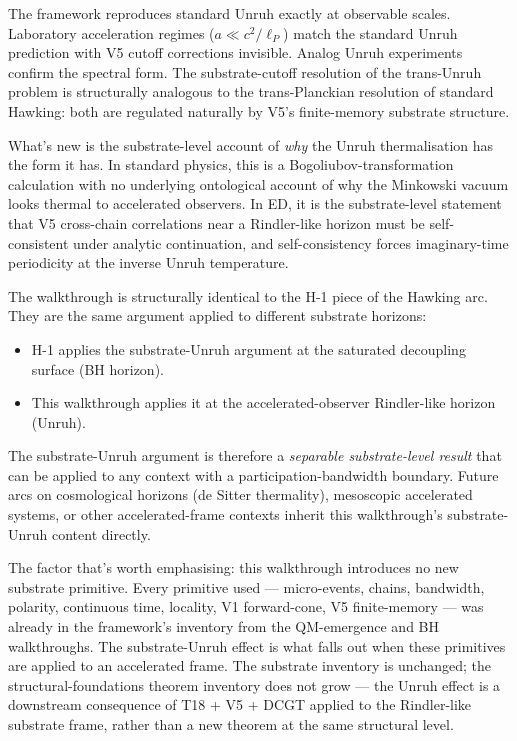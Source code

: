 \documentclass[11pt,a4paper]{article}
\begin{document}
The framework reproduces standard Unruh exactly at observable scales. Laboratory acceleration regimes ($a \ll c^{2}/\ell_P$) match the standard Unruh prediction with V5 cutoff corrections invisible. Analog Unruh experiments confirm the spectral form. The substrate-cutoff resolution of the trans-Unruh problem is structurally analogous to the trans-Planckian resolution of standard Hawking: both are regulated naturally by V5's finite-memory substrate structure.

What's new is the substrate-level account of \emph{why} the Unruh thermalisation has the form it has. In standard physics, this is a Bogoliubov-transformation calculation with no underlying ontological account of why the Minkowski vacuum looks thermal to accelerated observers. In ED, it is the substrate-level statement that V5 cross-chain correlations near a Rindler-like horizon must be self-consistent under analytic continuation, and self-consistency forces imaginary-time periodicity at the inverse Unruh temperature.

The walkthrough is structurally identical to the H-1 piece of the Hawking arc. They are the same argument applied to different substrate horizons:
\begin{itemize}[noitemsep]
\item H-1 applies the substrate-Unruh argument at the saturated decoupling surface (BH horizon).
\item This walkthrough applies it at the accelerated-observer Rindler-like horizon (Unruh).
\end{itemize}

The substrate-Unruh argument is therefore a \emph{separable substrate-level result} that can be applied to any context with a participation-bandwidth boundary. Future arcs on cosmological horizons (de Sitter thermality), mesoscopic accelerated systems, or other accelerated-frame contexts inherit this walkthrough's substrate-Unruh content directly.

The factor that's worth emphasising: this walkthrough introduces no new substrate primitive. Every primitive used --- micro-events, chains, bandwidth, polarity, continuous time, locality, V1 forward-cone, V5 finite-memory --- was already in the framework's inventory from the QM-emergence and BH walkthroughs. The substrate-Unruh effect is what falls out when these primitives are applied to an accelerated frame. The substrate inventory is unchanged; the structural-foundations theorem inventory does not grow --- the Unruh effect is a downstream consequence of T18 + V5 + DCGT applied to the Rindler-like substrate frame, rather than a new theorem at the same structural level.
\end{document}
